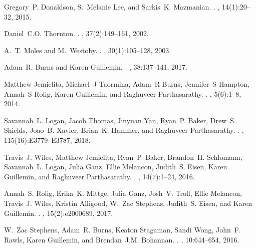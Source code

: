 \begin{thebibliography}{10}
	Gregory~P. Donaldson, S.~Melanie Lee, and Sarkis~K. Mazmanian.
	.
	, 14(1):20--32, 2015.
	
	Daniel~C.O. Thornton.
	.
	, 37(2):149--161, 2002.
	
	A.~T. Moles and M.~Westoby.
	.
	, 30(1):105--128, 2003.
	
	Adam~R. Burns and Karen Guillemin.
	.
	, 38:137--141, 2017.
	
	Matthew Jemielita, Michael~J Taormina, Adam~R Burns, Jennifer~S Hampton,
	Annah~S Rolig, Karen Guillemin, and Raghuveer Parthasarathy.
	.
	, 5(6):1--8, 2014.
	
	Savannah~L. Logan, Jacob Thomas, Jinyuan Yan, Ryan~P. Baker, Drew~S. Shields,
	Joao~B. Xavier, Brian~K. Hammer, and Raghuveer Parthasarathy.
	.
	,
	115(16):E3779--E3787, 2018.
	
	Travis~J. Wiles, Matthew Jemielita, Ryan~P. Baker, Brandon~H. Schlomann,
	Savannah~L. Logan, Julia Ganz, Ellie Melancon, Judith~S. Eisen, Karen
	Guillemin, and Raghuveer Parthasarathy.
	.
	, 14(7):1--24, 2016.
	
	Annah~S. Rolig, Erika~K. Mittge, Julia Ganz, Josh~V. Troll, Ellie Melancon,
	Travis~J. Wiles, Kristin Alligood, W.~Zac Stephens, Judith~S. Eisen, and
	Karen Guillemin.
	.
	, 15(2):e2000689, 2017.
	
	W.~Zac Stephens, Adam~R. Burns, Keaton Stagaman, Sandi Wong, John~F. Rawls,
	Karen Guillemin, and Brendan~J.M. Bohannan.
	.
	, 10:644--654, 2016.
	

\end{thebibliography}
